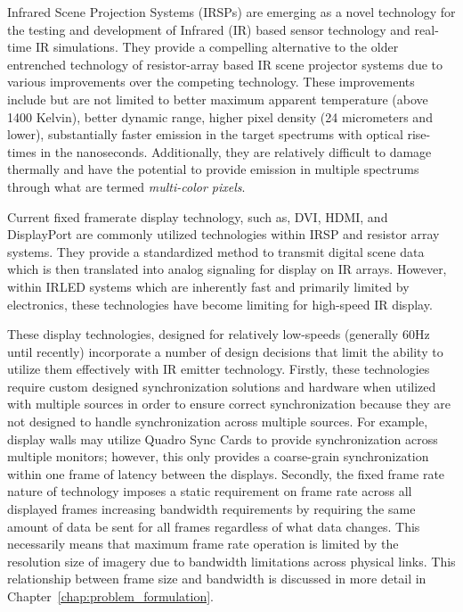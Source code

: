 \label{chap:introduction}

Infrared Scene Projection Systems (IRSPs) are emerging as a novel technology for the testing and development of Infrared (IR) based sensor technology and real-time IR simulations. They provide a compelling alternative to the older entrenched technology of resistor-array based IR scene projector systems\cite{pritchard1998design,williams2005history} due to various improvements over the competing technology. These improvements include but are not limited to better maximum apparent temperature (above 1400 Kelvin), better dynamic range, higher pixel density (24 micrometers and lower), substantially faster emission in the target spectrums with optical rise-times in the nanoseconds. Additionally, they are relatively difficult to damage thermally and have the potential to provide emission in multiple spectrums through what are termed \emph{multi-color pixels}.

Current fixed framerate display technology, such as, DVI\cite{DDWG1999}, HDMI\cite{HDMIForum2018}, and DisplayPort\cite{BhowmikEtAl2012} are commonly utilized technologies within IRSP and resistor array systems. They provide a standardized method to transmit digital scene data which is then translated into analog signaling for display on IR arrays. However, within IRLED systems which are inherently fast and primarily limited by electronics, these technologies have become limiting for high-speed IR display\cite{EjzakEtAl2016,LaVeignePrewarski2013}.

These display technologies, designed for relatively low-speeds (generally 60Hz until recently) incorporate a number of design decisions that limit the ability to utilize them effectively with IR emitter technology. Firstly, these technologies require custom designed synchronization solutions and hardware when utilized with multiple sources in order to ensure correct synchronization because they are not designed to handle synchronization across multiple sources. For example, display walls may utilize Quadro Sync Cards\cite{NVIDIAQuadroSync} to provide synchronization across multiple monitors; however, this only provides a coarse-grain synchronization within one frame of latency between the displays. Secondly, the fixed frame rate nature of technology imposes a static requirement on frame rate across all displayed frames increasing bandwidth requirements by requiring the same amount of data be sent for all frames regardless of what data changes. This necessarily means that maximum frame rate operation is limited by the resolution size of imagery due to bandwidth limitations across physical links. This relationship between frame size and bandwidth is discussed in more detail in Chapter~\ref{chap:problem_formulation}.

